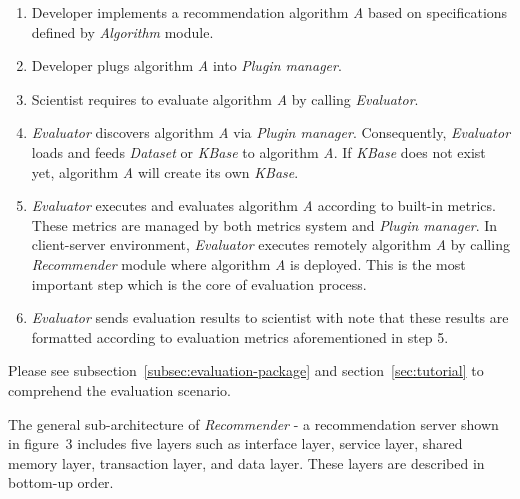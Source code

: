 \documentclass[a4paper]{llncs}
\begin{document}
\begin{enumerate}
\item Developer implements a recommendation algorithm \textit{A} based on specifications defined by \textit{Algorithm} module.
\item Developer plugs algorithm \textit{A} into \textit{Plugin manager}.
\item Scientist requires to evaluate algorithm \textit{A} by calling \textit{Evaluator}.
\item \textit{Evaluator} discovers algorithm \textit{A} via \textit{Plugin manager}. Consequently, \textit{Evaluator} loads and feeds \textit{Dataset} or \textit{KBase} to algorithm \textit{A}. If \textit{KBase} does not exist yet, algorithm \textit{A} will create its own \textit{KBase}.
\item \textit{Evaluator} executes and evaluates algorithm \textit{A} according to built-in metrics. These metrics are managed by both metrics system and \textit{Plugin manager}. In client-server environment, \textit{Evaluator} executes remotely algorithm \textit{A} by calling \textit{Recommender} module where algorithm \textit{A} is deployed. This is the most important step which is the core of evaluation process.
\item \textit{Evaluator} sends evaluation results to scientist with note that these results are formatted according to evaluation metrics aforementioned in step 5.
\end{enumerate}
Please see subsection~\ref{subsec:evaluation-package} and section~\ref{sec:tutorial} to comprehend the evaluation scenario.

The general sub-architecture of \textit{Recommender} - a recommendation server shown in figure~3 includes five layers such as interface layer, service layer, shared memory layer, transaction layer, and data layer. These layers are described in bottom-up order.
\end{document}
